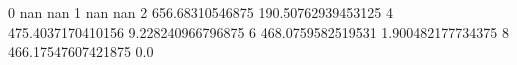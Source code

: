 0 nan nan
1 nan nan
2 656.68310546875 190.50762939453125
4 475.4037170410156 9.228240966796875
6 468.0759582519531 1.900482177734375
8 466.17547607421875 0.0
